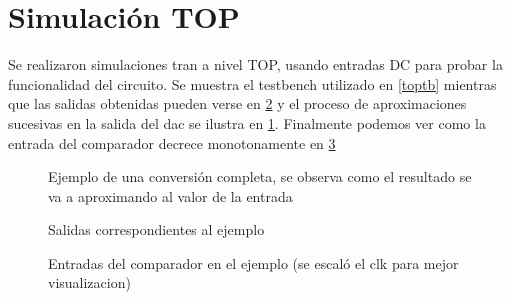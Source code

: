 \documentclass[12pt,a4paper]{report}
\begin{document}
\section{Simulación TOP}
Se realizaron simulaciones tran a nivel TOP, usando entradas DC para probar la funcionalidad del circuito. Se muestra el testbench utilizado en \cref{toptb} mientras que las salidas obtenidas pueden verse en \cref{topssalidas} y el proceso de aproximaciones sucesivas en la salida del dac se ilustra en \cref{topsen}. Finalmente podemos ver como la entrada del comparador decrece monotonamente en \cref{convcomp}


\begin{figure}[H]
    \centering
    
    \caption{Ejemplo de una conversión completa, se observa como el resultado se va a aproximando al valor de la entrada}
        \label{topsen}
\end{figure}

\begin{figure}[H]
    \centering
    
    \caption{Salidas correspondientes al ejemplo}
        \label{topssalidas}
\end{figure}

\begin{figure}[H]
    \centering
    
    \caption{Entradas del comparador en el ejemplo (se escaló el clk para mejor visualizacion)}
        \label{convcomp}
\end{figure}
\end{document}
